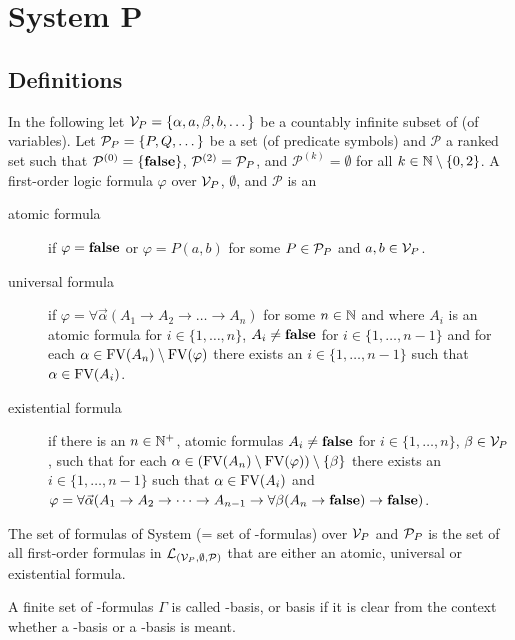 \section{System P}
\subsection{Definitions}
In the following let $\mathcal{V}_P=\{\alpha,a,\beta,b,\dots\}$ be a countably infinite subset of \lambdaTypVar{} (of variables). 
Let $\mathcal{P}_P=\{P,Q,\dots\}$ be a set (of predicate symbols) and $\mathcal{P}$ a ranked set such that $\mathcal{P}^{(0)}=\{\textbf{false}\}$, $\mathcal{P}^{(2)}=\mathcal{P}_P$, and $\mathcal{P}^{(k)}=\emptyset$ for all $k\in\mathbb{N}\setminus\{0,2\}$.
A first-order logic formula $\varphi$ over $\mathcal{V}_P$, $\emptyset$, and $\mathcal{P}$ is an
\begin{description} %
	\item[atomic formula] if $\varphi=\textbf{false}$ or $\varphi=P(a,b)$ for some $P\in\mathcal{P}_P$ and $a,b\in\mathcal{V}_P$.
	\item[universal formula] if $\varphi=\forall\vec{\alpha}(A_1\to A_2 \to\dots\to A_n)$ for some $n\in\mathbb{N}$ and where $A_i$ is an atomic formula for $i\in\{1,\dots,n\}$, $A_i\neq\textbf{false}$ for $i\in\{1,\dots,n-1\}$ and for each $\alpha\in\text{FV}(A_n)\setminus\text{FV}(\varphi)$ %
	 there exists an $i\in\{1,\dots,n-1\}$ such that $\alpha\in\text{FV}(A_i)$.
	\item[existential formula] if there is an $n\in\mathbb{N}^+$, atomic formulas $A_i\neq\textbf{false}$ for $i\in\{1,\dots,n\}$, $\beta\in\mathcal{V}_P$, such that for each $\alpha\in(\text{FV}(A_n)\setminus\text{FV}(\varphi))\setminus\{\beta\}$ there exists an $i\in\{1,\dots,n-1\}$ such that $\alpha\in\text{FV}(A_i)$ and $\varphi=\forall\vec{\alpha}(A_1\to A_2 \to\dots\to A_{n-1}\to\forall\beta(A_n\to\textbf{false})\to\textbf{false})$.
\end{description}
The set of formulas of System \SysP{} (= set of \SysP-formulas) over $\mathcal{V}_P$ and $\mathcal{P}_P$ is the set of all first-order formulas in $\mathcal{L}_{(\mathcal{V}_P,\emptyset,\mathcal{P})}$ that are either an atomic, universal or existential formula.

\begin{definition}
A finite set of \SysP-formulas $\Gamma$ is called \SysP-basis, or basis if it is clear from the context whether a \SysP-basis or a \lambdaTwo-basis is meant.
\end{definition}

